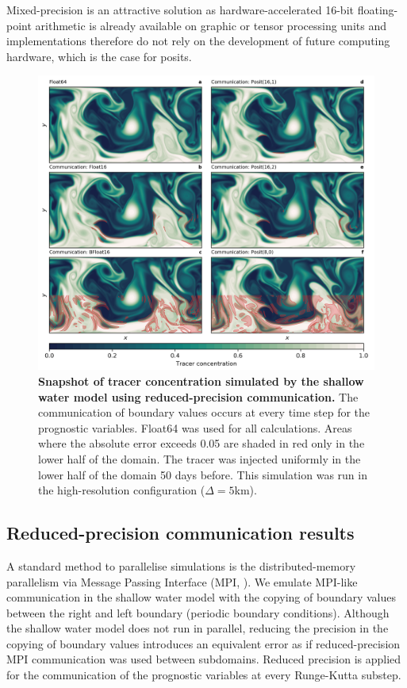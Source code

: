 Mixed-precision is an attractive solution as hardware-accelerated 16-bit floating-point arithmetic is already available on graphic or
tensor processing units and implementations therefore do not rely on the development of future computing hardware, which is the
case for posits.

\begin{figure}
\includegraphics[width=1\textwidth]{Figures/swm/snapshot_comm.png}
\caption{\textbf{Snapshot of tracer concentration simulated by the shallow water model using reduced-precision communication.}
The communication of boundary values occurs at every time step for the prognostic variables. Float64 was used for all calculations.
Areas where the absolute error exceeds 0.05 are shaded in red only in the lower half of the domain. The tracer was injected uniformly
in the lower half of the domain 50 days before. This simulation was run in the high-resolution configuration ($\Delta = 5$km).}
\label{fig:snapshot_comm}
\end{figure}

\subsection{Reduced-precision communication results}
\label{sec:swm_results_comm}

A standard method to parallelise simulations is the distributed-memory parallelism via Message Passing Interface (MPI, \cite{TheMPIForum1993}).
We emulate MPI-like communication in the shallow water model with the copying of boundary values between the right and left boundary (periodic
boundary conditions). Although the shallow water model does not run in parallel, reducing the precision in the copying of boundary values
introduces an equivalent error as if reduced-precision MPI communication was used between subdomains. Reduced precision is applied
for the communication of the prognostic variables at every Runge-Kutta substep.

